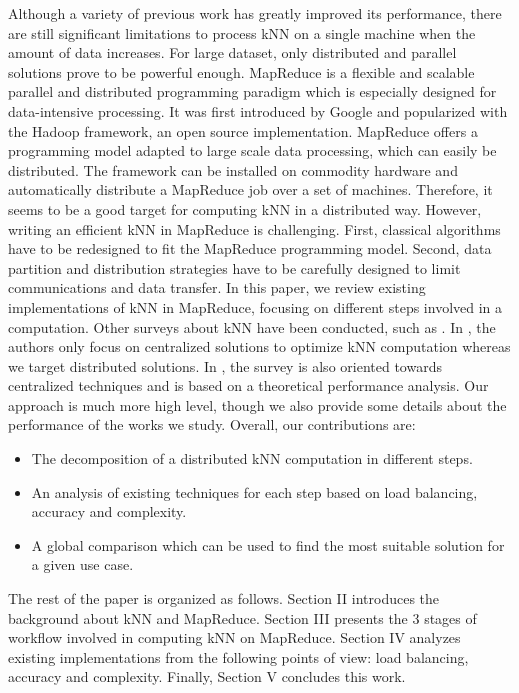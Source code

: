 Although a variety of previous work has greatly improved its performance, there are still significant limitations to process kNN on a single machine when the amount of data increases. For large dataset, only distributed and parallel solutions prove to be powerful enough. 
MapReduce is a flexible and scalable parallel and distributed programming paradigm which is especially designed for data-intensive processing. It was first 
introduced by Google \cite{Dean:2008:MSD:1327452.1327492} and popularized with the Hadoop\cite{Hadoop:Website} framework, an open source 
implementation. MapReduce offers a programming model adapted to large scale data processing, which can easily be distributed. The framework can be 
installed on commodity hardware and automatically distribute a MapReduce job over a set of machines. Therefore, it seems to be a good target for 
computing kNN in a distributed way. However, writing an efficient kNN in MapReduce is challenging. First, classical algorithms have to be redesigned
to fit the MapReduce programming model.  Second, data partition and distribution strategies have to be carefully designed to limit 
communications and data transfer. 
In this paper, we review existing implementations of kNN in MapReduce, focusing on different steps involved in a computation. 
Other surveys about kNN have been conducted, such as \cite{SurveyNNTechniques,Jiang:2007:SIK:1302500.1303257}. In \cite{SurveyNNTechniques}, the authors 
only focus on centralized solutions to optimize kNN computation whereas we target distributed solutions. In \cite{Jiang:2007:SIK:1302500.1303257}, the 
survey is also oriented towards centralized techniques and is based on a theoretical performance analysis. Our approach is much more high level, though we 
also provide some details about the performance of the works we study. 
Overall, our contributions are:
\begin{itemize}
\item The decomposition of a distributed kNN computation in different steps.
\item An analysis of existing techniques for each step based on load balancing, accuracy and complexity.
\item A global comparison which can be used to find the most suitable solution for a given use case.
\end{itemize}

The rest of the paper is organized as follows. Section II introduces the background about kNN and MapReduce. Section III presents the 3 stages of
workflow involved in computing kNN on MapReduce. Section IV analyzes existing implementations from the following points of view: load balancing, accuracy and complexity. Finally,
Section V concludes this work.

